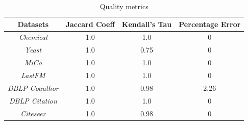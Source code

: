 \begin{table}[tb!]
	\vspace{-2mm}
	\begin{center}
		\vspace{-1mm}
		\centering
		\caption{Quality metrics\label{tab:quality}}
		\vspace{-3mm}
		\begin{tabular} {cccc}
			\hline
			Datasets  & Jaccard Coeff & Kendall's Tau  & Percentage Error\\			 
			\hline 
			{\em Chemical}   &   1.0   &  1.0   & 0\\
			{\em Yeast}   &   1.0    &  0.75  & 0\\
			{\em MiCo}   &   1.0    &  1.0   & 0\\ 
			{\em LastFM}   &  1.0   &  1.0 & 0\\
			{\em DBLP Coauthor}   &   1.0  &  0.98  & 2.26\\ 
			{\em DBLP Citation}   &   1.0   &  1.0   & 0\\
			{\em Citeseer}   &   1.0   &  0.98 & 0\\
			
			\hline
		\end{tabular}
	\end{center}
	\vspace{-4mm}
\end{table}






